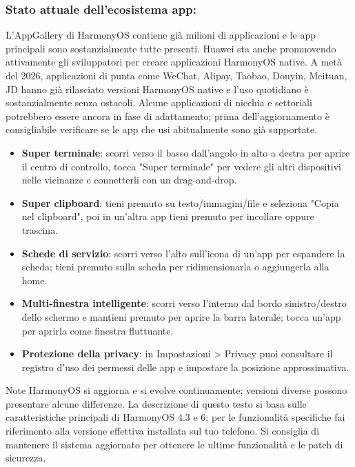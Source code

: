\subsubsection*{Stato attuale dell'ecosistema app:}

L'AppGallery di HarmonyOS contiene già milioni di applicazioni e le app principali sono sostanzialmente tutte presenti. Huawei sta anche promuovendo attivamente gli sviluppatori per creare applicazioni HarmonyOS native. A metà del 2026, applicazioni di punta come WeChat, Alipay, Taobao, Douyin, Meituan, JD hanno già rilasciato versioni HarmonyOS native e l'uso quotidiano è sostanzialmente senza ostacoli. Alcune applicazioni di nicchia e settoriali potrebbero essere ancora in fase di adattamento; prima dell'aggiornamento è consigliabile verificare se le app che usi abitualmente sono già supportate.


\begin{itemize}
  \item \textbf{Super terminale}: scorri verso il basso dall'angolo in alto a destra per aprire il centro di controllo, tocca "Super terminale" per vedere gli altri dispositivi nelle vicinanze e connetterli con un drag-and-drop.
  \item \textbf{Super clipboard}: tieni premuto su testo/immagini/file e seleziona "Copia nel clipboard", poi in un'altra app tieni premuto per incollare oppure trascina.
  \item \textbf{Schede di servizio}: scorri verso l'alto sull'icona di un'app per espandere la scheda; tieni premuto sulla scheda per ridimensionarla o aggiungerla alla home.
  \item \textbf{Multi-finestra intelligente}: scorri verso l'interno dal bordo sinistro/destro dello schermo e mantieni premuto per aprire la barra laterale; tocca un'app per aprirla come finestra fluttuante.
  \item \textbf{Protezione della privacy}: in Impostazioni > Privacy puoi consultare il registro d'uso dei permessi delle app e impostare la posizione approssimativa.
\end{itemize}

\begin{tcbwarn}{Note}
HarmonyOS si aggiorna e si evolve continuamente; versioni diverse possono presentare alcune differenze. La descrizione di questo testo si basa sulle caratteristiche principali di HarmonyOS 4.3 e 6; per le funzionalità specifiche fai riferimento alla versione effettiva installata sul tuo telefono. Si consiglia di mantenere il sistema aggiornato per ottenere le ultime funzionalità e le patch di sicurezza.

\end{tcbwarn}

